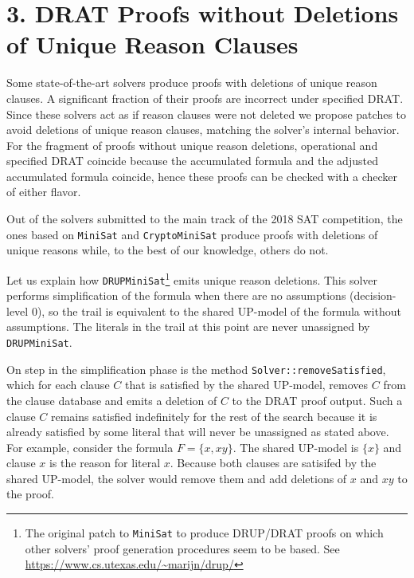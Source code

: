 \documentclass[
]{report}
\begin{document}
\hypertarget{drat-proofs-without-deletions-of-unique-reason-clauses}{%
\chapter{3. DRAT Proofs without Deletions of Unique Reason
Clauses}\label{drat-proofs-without-deletions-of-unique-reason-clauses}}

Some state-of-the-art solvers produce proofs with deletions of unique
reason clauses. A significant fraction of their proofs are incorrect
under specified DRAT. Since these solvers act as if reason clauses were
not deleted we propose patches to avoid deletions of unique reason
clauses, matching the solver's internal behavior. For the fragment of
proofs without unique reason deletions, operational and specified DRAT
coincide because the accumulated formula and the adjusted accumulated
formula coincide, hence these proofs can be checked with a checker of
either flavor.

Out of the solvers submitted to the main track of the 2018 SAT
competition, the ones based on \texttt{MiniSat} and
\texttt{CryptoMiniSat} produce proofs with deletions of unique reasons
while, to the best of our knowledge, others do not.

Let us explain how \texttt{DRUPMiniSat}\footnote{The original patch to
  \texttt{MiniSat} to produce DRUP/DRAT proofs on which other solvers'
  proof generation procedures seem to be based. See
  \url{https://www.cs.utexas.edu/~marijn/drup/}} emits unique reason
deletions. This solver performs simplification of the formula when there
are no assumptions (decision-level 0), so the trail is equivalent to the
shared UP-model of the formula without assumptions. The literals in the
trail at this point are never unassigned by \texttt{DRUPMiniSat}.

On step in the simplification phase is the method
\texttt{Solver::removeSatisfied}, which for each clause \(C\) that is
satisfied by the shared UP-model, removes \(C\) from the clause database
and emits a deletion of \(C\) to the DRAT proof output. Such a clause
\(C\) remains satisfied indefinitely for the rest of the search because
it is already satisfied by some literal that will never be unassigned as
stated above. For example, consider the formula \(F = \{x, xy\}\). The
shared UP-model is \(\{x\}\) and clause \(x\) is the reason for literal
\(x\). Because both clauses are satisifed by the shared UP-model, the
solver would remove them and add deletions of \(x\) and \(xy\) to the
proof.
\end{document}
